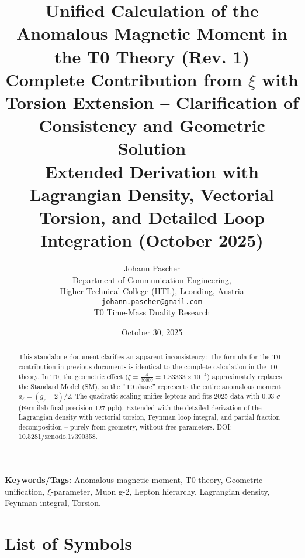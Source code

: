 \documentclass[12pt,a4paper]{article}
\title{\textbf{Unified Calculation of the Anomalous Magnetic Moment in the T0 Theory (Rev. 1)}\\[0.5cm]
	\large Complete Contribution from $\xi$ with Torsion Extension -- Clarification of Consistency and Geometric Solution\\[0.3cm]
	\normalsize Extended Derivation with Lagrangian Density, Vectorial Torsion, and Detailed Loop Integration (October 2025)}
\author{Johann Pascher\\
	\small Department of Communication Engineering,\\
	\small Higher Technical College (HTL), Leonding, Austria\\
	\small \texttt{johann.pascher@gmail.com}\\
	\small T0 Time-Mass Duality Research}
\date{October 30, 2025}
\begin{document}
	
	\maketitle
	\thispagestyle{fancy}
	
	\begin{abstract}
		This standalone document clarifies an apparent inconsistency: The formula for the T0 contribution in previous documents is identical to the complete calculation in the T0 theory. In T0, the geometric effect ($\xi = \frac{4}{30000} = 1.33333 \times 10^{-4}$) approximately replaces the Standard Model (SM), so the ``T0 share'' represents the entire anomalous moment $a_\ell = (g_\ell - 2)/2$. The quadratic scaling unifies leptons and fits 2025 data with 0.03 $\sigma$ (Fermilab final precision 127 ppb). Extended with the detailed derivation of the Lagrangian density with vectorial torsion, Feynman loop integral, and partial fraction decomposition -- purely from geometry, without free parameters. DOI: 10.5281/zenodo.17390358.
	\end{abstract}
	
	\textbf{Keywords/Tags:} Anomalous magnetic moment, T0 theory, Geometric unification, $\xi$-parameter, Muon g-2, Lepton hierarchy, Lagrangian density, Feynman integral, Torsion.
	
	\tableofcontents
	
	\section*{List of Symbols}
	
\end{document}
